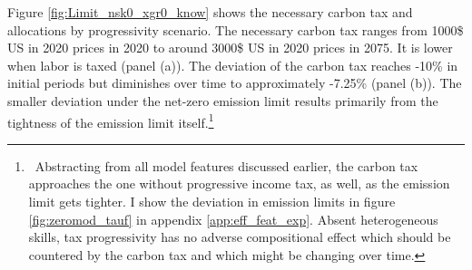 Figure \ref{fig:Limit_nsk0_xgr0_know} shows the necessary carbon tax and allocations by progressivity scenario. 
The necessary carbon tax ranges from 1000\$ US in 2020 prices in 2020 to around 3000\$ US in 2020 prices in 2075. It is lower when labor is taxed (panel (a)). The deviation of the carbon tax reaches -10\% in initial periods but diminishes over time to approximately -7.25\% (panel (b)).
The smaller deviation under the net-zero emission limit results primarily from the tightness of the emission limit itself.\footnote{\ Abstracting from all model features discussed earlier, the carbon tax approaches the one without progressive income tax, as well, as the emission limit gets tighter. I show the deviation in emission limits in figure \ref{fig:zeromod_tauf} in appendix \ref{app:eff_feat_exp}. Absent heterogeneous skills, tax progressivity has no adverse compositional effect which should be countered by the carbon tax and which might be changing over time. }





